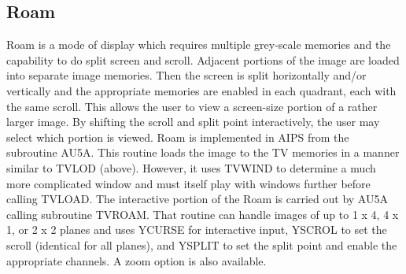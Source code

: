 \subsection{Roam}
Roam is a mode of display which requires multiple grey-scale memories
and the capability to do split screen and scroll. Adjacent portions of
the image are loaded into separate image memories.  Then the screen is
split horizontally and/or vertically and the appropriate memories are
enabled in each quadrant, each with the same scroll.  This allows the
user to view a screen-size portion of a rather larger image.  By
shifting the scroll and split point interactively, the user may select
which portion is viewed.  Roam is implemented in AIPS from the
subroutine AU5A.  This routine loads the image to the TV memories in a
manner similar to TVLOD (above).  However, it uses TVWIND
to determine a much more complicated window and must itself play with
windows further before calling TVLOAD.  The interactive
portion of the Roam is carried out by AU5A calling subroutine
TVROAM.  That
routine can handle images of up to 1 x 4, 4 x 1, or 2 x 2 planes and uses
YCURSE for interactive input, YSCROL to set the scroll
(identical for all planes), and YSPLIT to set the split
point and enable the appropriate channels.  A zoom option is also available.

